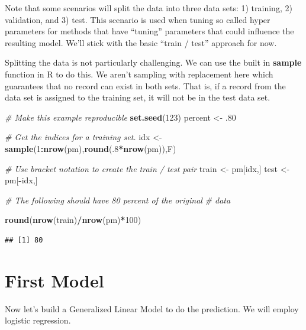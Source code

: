 \documentclass[]{book}
\newenvironment{Shaded}{\begin{snugshade}}{\end{snugshade}}
\newcommand{\KeywordTok}[1]{\textcolor[rgb]{0.13,0.29,0.53}{\textbf{#1}}}
\newcommand{\DecValTok}[1]{\textcolor[rgb]{0.00,0.00,0.81}{#1}}
\newcommand{\StringTok}[1]{\textcolor[rgb]{0.31,0.60,0.02}{#1}}
\newcommand{\CommentTok}[1]{\textcolor[rgb]{0.56,0.35,0.01}{\textit{#1}}}
\newcommand{\OperatorTok}[1]{\textcolor[rgb]{0.81,0.36,0.00}{\textbf{#1}}}
\newcommand{\NormalTok}[1]{#1}
\begin{document}
Note that some scenarios will split the data into three data sets: 1)
training, 2) validation, and 3) test. This scenario is used when tuning
so called hyper parameters for methods that have ``tuning'' parameters
that could influence the resulting model. We'll stick with the basic
``train / test'' approach for now.

Splitting the data is not particularly challenging. We can use the built
in \textbf{sample} function in R to do this. We aren't sampling with
replacement here which guarantees that no record can exist in both sets.
That is, if a record from the data set is assigned to the training set,
it will not be in the test data set.

\begin{Shaded}
\begin{Highlighting}[]
\CommentTok{# Make this example reproducible}
\KeywordTok{set.seed}\NormalTok{(}\DecValTok{123}\NormalTok{) }
\NormalTok{percent <-}\StringTok{ }\NormalTok{.}\DecValTok{80}

\CommentTok{# Get the indices for a training set.}
\NormalTok{idx <-}\StringTok{ }\KeywordTok{sample}\NormalTok{(}\DecValTok{1}\OperatorTok{:}\KeywordTok{nrow}\NormalTok{(pm),}\KeywordTok{round}\NormalTok{(.}\DecValTok{8}\OperatorTok{*}\KeywordTok{nrow}\NormalTok{(pm)),F)}

\CommentTok{# Use bracket notation to create the train / test pair}
\NormalTok{train <-}\StringTok{ }\NormalTok{pm[idx,]}
\NormalTok{test  <-}\StringTok{ }\NormalTok{pm[}\OperatorTok{-}\NormalTok{idx,]}

\CommentTok{# The following should have 80 percent of the original }
\CommentTok{# data}

\KeywordTok{round}\NormalTok{(}\KeywordTok{nrow}\NormalTok{(train)}\OperatorTok{/}\KeywordTok{nrow}\NormalTok{(pm)}\OperatorTok{*}\DecValTok{100}\NormalTok{)}
\end{Highlighting}
\end{Shaded}

\begin{verbatim}
## [1] 80
\end{verbatim}

\section{First Model}\label{first-model}

Now let's build a Generalized Linear Model to do the prediction. We will
employ logistic regression.
\end{document}
